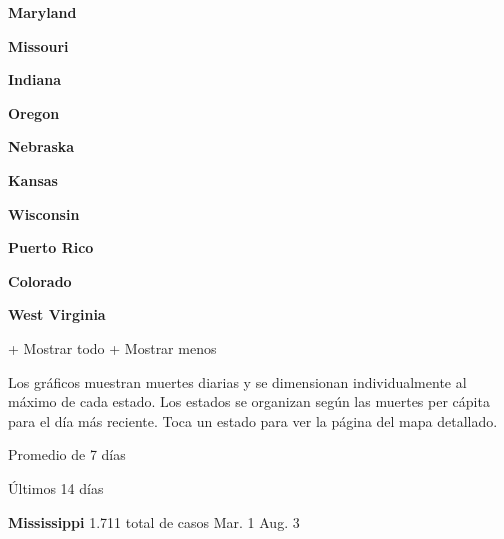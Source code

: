 \textbf{Maryland}

\href{https://www.nytimes3xbfgragh.onion/interactive/2020/us/missouri-coronavirus-cases.html}{}

\textbf{Missouri}

\href{https://www.nytimes3xbfgragh.onion/interactive/2020/us/indiana-coronavirus-cases.html}{}

\textbf{Indiana}

\href{https://www.nytimes3xbfgragh.onion/interactive/2020/us/oregon-coronavirus-cases.html}{}

\textbf{Oregon}

\href{https://www.nytimes3xbfgragh.onion/interactive/2020/us/nebraska-coronavirus-cases.html}{}

\textbf{Nebraska}

\href{https://www.nytimes3xbfgragh.onion/interactive/2020/us/kansas-coronavirus-cases.html}{}

\textbf{Kansas}

\href{https://www.nytimes3xbfgragh.onion/interactive/2020/us/wisconsin-coronavirus-cases.html}{}

\textbf{Wisconsin}

\href{https://www.nytimes3xbfgragh.onion/interactive/2020/us/puerto-rico-coronavirus-cases.html}{}

\textbf{Puerto Rico}

\href{https://www.nytimes3xbfgragh.onion/interactive/2020/us/colorado-coronavirus-cases.html}{}

\textbf{Colorado}

\href{https://www.nytimes3xbfgragh.onion/interactive/2020/us/west-virginia-coronavirus-cases.html}{}

\textbf{West Virginia}

+ Mostrar todo + Mostrar menos

Los gráficos muestran muertes diarias y se dimensionan individualmente
al máximo de cada estado. Los estados se organizan según las muertes per
cápita para el día más reciente. Toca un estado para ver la página del
mapa detallado.

\href{https://www.nytimes3xbfgragh.onion/interactive/2020/us/mississippi-coronavirus-cases.html}{}

Promedio de 7 días

Últimos 14 días

\textbf{Mississippi} 1.711 total de casos Mar. 1 Aug. 3

\href{https://www.nytimes3xbfgragh.onion/interactive/2020/us/florida-coronavirus-cases.html}{}

